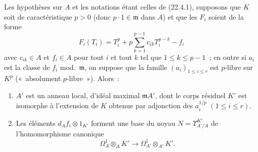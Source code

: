 \begin{proposition}[22.4.4]
\label{0.22.4.4-fr}
Les hypothèses sur $A$ et les notations étant celles de (22.4.1), supposons
que $K$ soit de caractéristique $p>0$ (donc $p\cdot1\in\mathfrak m$ dans
$A$) et que les $F_i$ soient de la forme
\begin{equation}
\label{0.22.4.4.1-fr}
  F_i(T_i)=T_i^p+p\sum_{k=1}^{p-1}c_{ik}T_i^{p-k}-f_i
  \tag{22.4.4.1}
\end{equation}
avec $c_{ik}\in A$ et $f_i\in A$ pour tout $i$ et tout $k$ tel que
$1\leqslant k\leqslant p-1$~; en outre si $a_i$ est la classe de $f_i$
mod.~$\mathfrak m$, on suppose que la famille $(a_i)_{1\leqslant i\leqslant r}$
est $p$-libre sur $K^p$ («~absolument $p$-libre~»). Alors~:
\begin{enumerate}
  \item[(i)] $A'$ est un anneau local, d'idéal maximal $\mathfrak mA'$,
  dont le corps résiduel $K'$ est isomorphe à l'extension de $K$ obtenue par
  adjonction des $a_i^{1/p}$ $(1\leqslant i\leqslant r)$.


  \item[(ii)] Les éléments $d_Af_i\otimes1_{K'}$ forment une base du noyau
  $N=\Upsilon^{K'}_{A'/A}$ de l'homomorphisme canonique
  \[
    \Omega^1_A\otimes_AK'\longrightarrow
    \Omega^1_{A'}\otimes_{A'}K'.
  \]
\end{enumerate}
\end{proposition}

